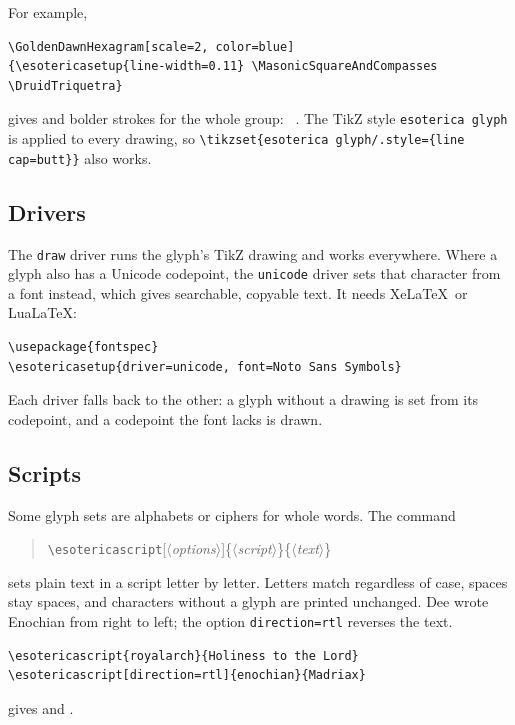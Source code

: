\documentclass[11pt]{article}
\newcommand\cs[1]{\texttt{\textbackslash#1}}
\newcommand\meta[1]{\ensuremath{\langle}\textit{#1}\ensuremath{\rangle}}
\newcommand\oarg[1]{[\meta{#1}]}
\begin{document}
\noindent For example,
\begin{verbatim}
\GoldenDawnHexagram[scale=2, color=blue]
{\esotericasetup{line-width=0.11} \MasonicSquareAndCompasses \DruidTriquetra}
\end{verbatim}
\noindent gives \GoldenDawnHexagram[scale=2, color=blue] and bolder strokes
for the whole group:
{\MasonicSquareAndCompasses\ \DruidTriquetra}.
The TikZ style \texttt{esoterica glyph} is applied to every drawing, so
\verb|\tikzset{esoterica glyph/.style={line cap=butt}}| also works.

\subsection{Drivers}

The \texttt{draw} driver runs the glyph's TikZ drawing and works everywhere.
Where a glyph also has a Unicode codepoint, the \texttt{unicode} driver sets
that character from a font instead, which gives searchable, copyable text.
It needs Xe\LaTeX\ or Lua\LaTeX:

\begin{verbatim}
\usepackage{fontspec}
\esotericasetup{driver=unicode, font=Noto Sans Symbols}
\end{verbatim}

\noindent Each driver falls back to the other: a glyph without a drawing is
set from its codepoint, and a codepoint the font lacks is drawn.

\subsection{Scripts}

Some glyph sets are alphabets or ciphers for whole words.  The command
\begin{quote}
  \cs{esotericascript}\oarg{options}\{\meta{script}\}\{\meta{text}\}
\end{quote}
sets plain text in a script letter by letter.  Letters match regardless of
case, spaces stay spaces, and characters without a glyph are printed
unchanged.  Dee wrote Enochian from right to left; the option
\texttt{direction=rtl} reverses the text.

\begin{verbatim}
\esotericascript{royalarch}{Holiness to the Lord}
\esotericascript[direction=rtl]{enochian}{Madriax}
\end{verbatim}

\noindent gives  and
.
\end{document}
